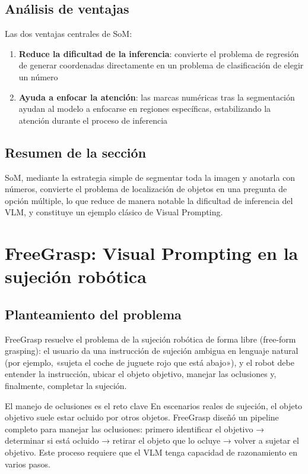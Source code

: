 \documentclass[a4paper]{article}
\begin{document}
\subsection{Análisis de ventajas}

Las dos ventajas centrales de SoM:

\begin{enumerate}
    \item \textbf{Reduce la dificultad de la inferencia}: convierte el problema de regresión de generar coordenadas directamente en un problema de clasificación de elegir un número
    \item \textbf{Ayuda a enfocar la atención}: las marcas numéricas tras la segmentación ayudan al modelo a enfocarse en regiones específicas, estabilizando la atención durante el proceso de inferencia
\end{enumerate}

\subsection{Resumen de la sección}

SoM, mediante la estrategia simple de segmentar toda la imagen y anotarla con números, convierte el problema de localización de objetos en una pregunta de opción múltiple, lo que reduce de manera notable la dificultad de inferencia del VLM, y constituye un ejemplo clásico de Visual Prompting.

\section{FreeGrasp: Visual Prompting en la sujeción robótica}

\subsection{Planteamiento del problema}

FreeGrasp resuelve el problema de la sujeción robótica de forma libre (free-form grasping): el usuario da una instrucción de sujeción ambigua en lenguaje natural (por ejemplo, «sujeta el coche de juguete rojo que está abajo»), y el robot debe entender la instrucción, ubicar el objeto objetivo, manejar las oclusiones y, finalmente, completar la sujeción.

\begin{knowledgebox}{El manejo de oclusiones es el reto clave}
En escenarios reales de sujeción, el objeto objetivo suele estar ocluido por otros objetos. FreeGrasp diseñó un pipeline completo para manejar las oclusiones: primero identificar el objetivo → determinar si está ocluido → retirar el objeto que lo ocluye → volver a sujetar el objetivo. Este proceso requiere que el VLM tenga capacidad de razonamiento en varios pasos.
\end{knowledgebox}
\end{document}
